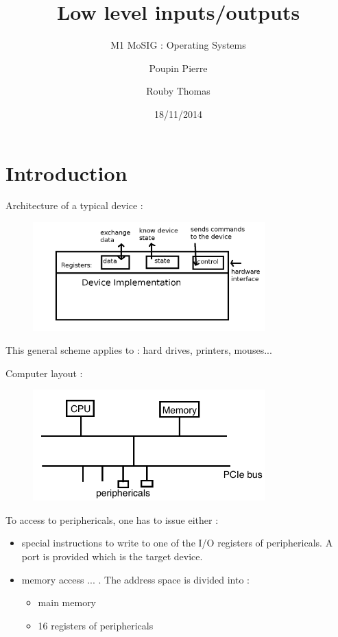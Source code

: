 \documentclass[a4paper,10pt]{article}
\title{\textbf{Low level inputs/outputs}}
\subtitle{M1 MoSIG : Operating Systems}
\author{Poupin Pierre \and Rouby Thomas}
\date{18/11/2014}
\begin{document}
\maketitle

\section{Introduction}

Architecture of a typical device :

\begin{figure}[h!]
  \begin{center}
    \includegraphics[width=0.8\textwidth]{architecture_device.png}
    \label{Architecture of a typical device}
  \end{center}
\end{figure}
This general scheme applies to : hard drives, printers, mouses...


Computer layout :
\begin{figure}[h!]
  \begin{center}
    \includegraphics[width=0.8\textwidth]{computer_layout.png}
    \label{fig:1}
  \end{center}
\end{figure}

To access to periphericals, one has to issue either :

\begin{itemize}
  \item special instructions to write to one of the I/O registers of periphericals.
  A port is provided which is the target device.
  
  \item memory access ... . The address space is divided into :
  \begin{itemize}
    \item  main memory
    \item 16 registers of periphericals
  \end{itemize}
\end{itemize}
\end{document}
